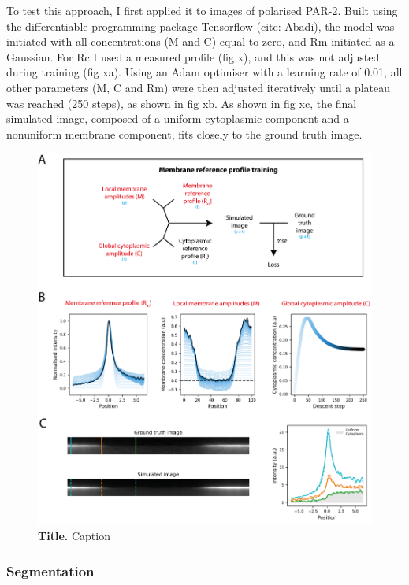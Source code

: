 \documentclass[12pt]{"article"}
\newcommand{\mycaption}[2]{\caption[#1]{\textbf{#1.} #2}}
\begin{document}
To test this approach, I first applied it to images of polarised PAR-2. Built using the differentiable programming package Tensorflow (cite: Abadi), the model was initiated with all concentrations (M and C) equal to zero, and Rm initiated as a Gaussian. For Rc I used a measured profile (fig x), and this was not adjusted during training (fig xa). Using an Adam optimiser with a learning rate of 0.01, all other parameters (M, C and Rm) were then adjusted iteratively until a plateau was reached (250 steps), as shown in fig xb. As shown in fig xc, the final simulated image, composed of a uniform cytoplasmic component and a nonuniform membrane component, fits closely to the ground truth image.\\


\begin{figure}[!h]
\includegraphics[scale=1]{memquant_membg_training}
\setlength{\abovecaptionskip}{20pt}
\centering
\mycaption{Title}{Caption}
\label{fig:memquant_membg_training}
\end{figure}


\subsubsection{Segmentation}
\end{document}
